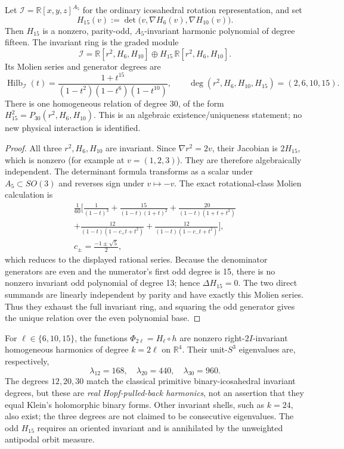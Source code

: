 \documentclass[12pt,a4paper]{article}
\begin{document}
\begin{theorem}
\label{p6c:thm:v322-icosahedral-invariant-algebra}
Let $\mathcal I=\mathbb R[x,y,z]^{A_5}$ for the ordinary icosahedral
rotation representation, and set
\[
 \boxed{H_{15}(v):=\det\big(v,\nabla H_6(v),\nabla H_{10}(v)\big).}
\]
Then $H_{15}$ is a nonzero, parity-odd, $A_5$-invariant harmonic
polynomial of degree fifteen.  The invariant ring is the graded module
\[
 \boxed{\mathcal I=\mathbb R[r^2,H_6,H_{10}]
       \oplus H_{15}\,\mathbb R[r^2,H_6,H_{10}].}
\]
Its Molien series and generator degrees are
\[
 \boxed{\operatorname{Hilb}_{\mathcal I}(t)
 =\frac{1+t^{15}}{(1-t^2)(1-t^6)(1-t^{10})},
 \qquad \deg(r^2,H_6,H_{10},H_{15})=(2,6,10,15).}
\]
There is one homogeneous relation of degree 30, of the form
$H_{15}^2=P_{30}(r^2,H_6,H_{10})$.  This is an algebraic
existence/uniqueness statement; no new physical interaction is identified.
\end{theorem}
\begin{proof}
All three $r^2,H_6,H_{10}$ are invariant.  Since
$\nabla r^2=2v$, their Jacobian is $2H_{15}$, which is nonzero
(for example at $v=(1,2,3)$).  They are therefore algebraically
independent.  The determinant formula transforms as a scalar under
$A_5\subset SO(3)$ and reverses sign under $v\mapsto-v$.
The exact rotational-class Molien calculation is
\[
 \begin{aligned}
 \frac1{60}\biggl[\frac1{(1-t)^3}
 +\frac{15}{(1-t)(1+t)^2}
 +\frac{20}{(1-t)(1+t+t^2)}\\
 +\frac{12}{(1-t)(1-c_+t+t^2)}
 +\frac{12}{(1-t)(1-c_-t+t^2)}\biggr],\\
 c_{\pm}=\frac{-1\pm\sqrt5}{2},
 \end{aligned}
\]
which reduces to the displayed rational series.
Because the denominator generators are even and the numerator's first
odd degree is 15, there is no nonzero invariant odd polynomial of
degree 13; hence $\Delta H_{15}=0$.  The two direct summands are
linearly independent by parity and have exactly this Molien series.
Thus they exhaust the full invariant ring, and squaring the odd
generator gives the unique relation over the even polynomial base.
\end{proof}

\begin{corollary}
\label{p6c:cor:v322-three-primitive-lifts}
For $\ell\in\{6,10,15\}$, the functions
$\Phi_{2\ell}=H_\ell\circ h$ are nonzero right-$2I$-invariant
homogeneous harmonics of degree $k=2\ell$ on $\mathbb R^4$.
Their unit-$S^3$ eigenvalues are, respectively,
\[
 \boxed{\lambda_{12}=168,\quad\lambda_{20}=440,
 \quad\lambda_{30}=960.}
\]
The degrees $12,20,30$ match the classical primitive binary-icosahedral
invariant degrees, but these are \emph{real Hopf-pulled-back harmonics},
not an assertion that they equal Klein's holomorphic binary forms.
Other invariant shells, such as $k=24$, also exist; the three degrees
are not claimed to be consecutive eigenvalues.
The odd $H_{15}$ requires an oriented invariant and is annihilated by
the unweighted antipodal orbit measure.
\end{corollary}
\end{document}
